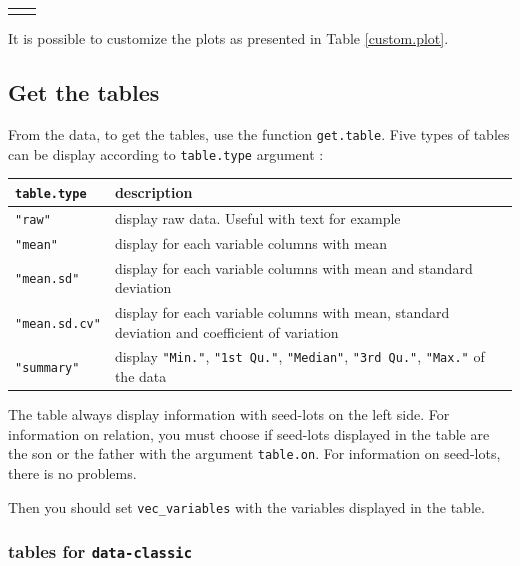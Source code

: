 \documentclass{article}\usepackage[]{graphicx}\usepackage[]{color}
\newenvironment{knitrout}{}{} %
\begin{document}
\begin{itemize}
\begin{center}
\begin{tabular}{cc}
\begin{knitrout}
{}



\end{knitrout}
&
\\
\end{tabular}
\end{center}


It is possible to customize the plots as presented in Table \ref{custom.plot}.


\subsection{Get the tables}

From the data, to get the tables, use the function \texttt{get.table}.
Five types of tables can be display according to \texttt{table.type} argument :

\begin{center}
\begin{tabular}{ll}
\hline
\texttt{table.type} & description \\
\hline

\texttt{"raw"} & display raw data. Useful with text for example \\
\hline

\texttt{"mean"} & display for each variable columns with mean \\
\hline

\texttt{"mean.sd"} & display for each variable columns with mean and standard deviation \\
\hline

\texttt{"mean.sd.cv"} & display for each variable columns with mean, standard deviation and coefficient of variation \\
\hline

\texttt{"summary"} & display \texttt{"Min."}, \texttt{"1st Qu."}, \texttt{"Median"}, \texttt{"3rd Qu."}, \texttt{"Max."} of the data \\
\hline
\end{tabular}
\end{center}

The table always display information with seed-lots on the left side.
For information on relation, you must choose if seed-lots displayed in the table are the son or the father with the argument \texttt{table.on}.
For information on seed-lots, there is no problems.

Then you should set \texttt{vec\_variables} with the variables displayed in the table.

\subsubsection{tables for \texttt{data-classic} }


\end{itemize}
\end{document}
